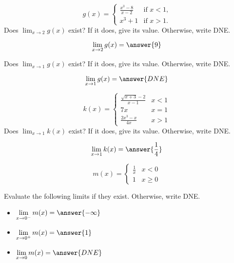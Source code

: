 \documentclass[handout]{ximera}
\begin{document}
\begin{exercise}
\[
g(x) = \begin{cases}
  \frac{x^3 - 8}{x-2}  &\text{if $x<1$,} \\
  x^3+1 &\text{if  $x>1$.}
\end{cases}
\]
Does $\lim_{x \to 2} g(x)$ exist?  If it does, give its value.
Otherwise, write DNE.

\[
\lim_{x \to 2} g(x) = \answer{9}
\]

Does $\lim_{x \to 1} g(x)$ exist?  If it does, give its value.
Otherwise, write DNE.

\[
\lim_{x \to 1} g(x) = \answer{DNE}
\]
\end{exercise}

\begin{exercise}
\[
k(x) = \begin{cases}
  \frac{\sqrt{x+3}-2}{x-1}  & x<1 \\
  7x & x=1 \\
  \frac{2x^3 -x}{4x} & x > 1
\end{cases}
\]
Does $\lim_{x \to 1} k(x)$ exist?  If it does, give its value.
Otherwise, write DNE.

\[
\lim_{x \to 1} k(x) = \answer{\frac{1}{4}}
\]
\end{exercise}

\begin{exercise}
\[
m(x) = \begin{cases}
  \frac{1}{x}  & x < 0 \\
  1 & x \geq 0
\end{cases}
\]

Evaluate the following limits if they exist.  Otherwise, write DNE. 

\begin{itemize}

\item $\displaystyle\lim_{x \to 0^-} m(x) = \answer{-\infty}$

\item $\displaystyle\lim_{x \to 0^+} m(x) = \answer{1}$

\item $\displaystyle\lim_{x \to 0} m(x) = \answer{DNE}$

\end{itemize}

\end{exercise}
\end{document}
